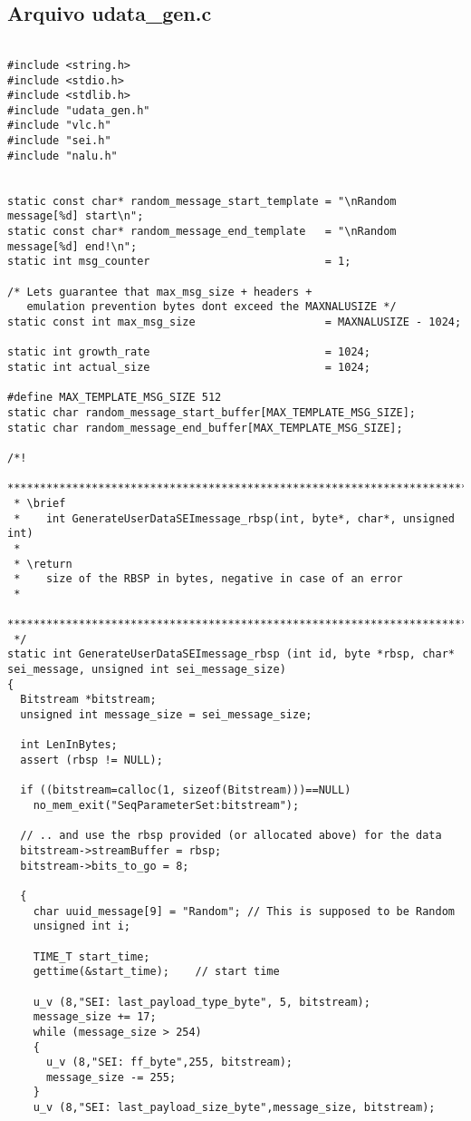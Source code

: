 \subsection{Arquivo udata\_gen.c}
\begin{lstlisting}

#include <string.h>
#include <stdio.h>
#include <stdlib.h>
#include "udata_gen.h"
#include "vlc.h"
#include "sei.h"
#include "nalu.h"


static const char* random_message_start_template = "\nRandom message[%d] start\n";
static const char* random_message_end_template   = "\nRandom message[%d] end!\n";
static int msg_counter                           = 1;

/* Lets guarantee that max_msg_size + headers + 
   emulation prevention bytes dont exceed the MAXNALUSIZE */
static const int max_msg_size                    = MAXNALUSIZE - 1024; 

static int growth_rate                           = 1024;
static int actual_size                           = 1024;

#define MAX_TEMPLATE_MSG_SIZE 512
static char random_message_start_buffer[MAX_TEMPLATE_MSG_SIZE];
static char random_message_end_buffer[MAX_TEMPLATE_MSG_SIZE]; 

/*!
 *************************************************************************************
 * \brief
 *    int GenerateUserDataSEImessage_rbsp(int, byte*, char*, unsigned int)
 *
 * \return
 *    size of the RBSP in bytes, negative in case of an error
 *
 *************************************************************************************
 */
static int GenerateUserDataSEImessage_rbsp (int id, byte *rbsp, char* sei_message, unsigned int sei_message_size)
{
  Bitstream *bitstream;
  unsigned int message_size = sei_message_size;

  int LenInBytes;
  assert (rbsp != NULL);

  if ((bitstream=calloc(1, sizeof(Bitstream)))==NULL)
    no_mem_exit("SeqParameterSet:bitstream");

  // .. and use the rbsp provided (or allocated above) for the data
  bitstream->streamBuffer = rbsp;
  bitstream->bits_to_go = 8;

  {
    char uuid_message[9] = "Random"; // This is supposed to be Random
    unsigned int i;

    TIME_T start_time;
    gettime(&start_time);    // start time

    u_v (8,"SEI: last_payload_type_byte", 5, bitstream);
    message_size += 17;
    while (message_size > 254)
    {
      u_v (8,"SEI: ff_byte",255, bitstream);
      message_size -= 255;
    }
    u_v (8,"SEI: last_payload_size_byte",message_size, bitstream);


\end{lstlisting}
